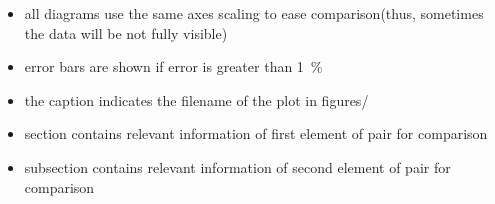 \documentclass[a4paper,10pt]{scrreprt}
\begin{document}
\begin{itemize}
  \item all diagrams use the same axes scaling to ease comparison\newline(thus, sometimes the data will be not fully visible)
  \item error bars are shown if error is greater than \SI{1}{\percent}
  \item the caption indicates the filename of the plot in figures/
  \item section contains relevant information of first element of pair for comparison
  \item subsection contains relevant information of second element of pair for comparison
\end{itemize}
  
\tableofcontents


\end{document}
